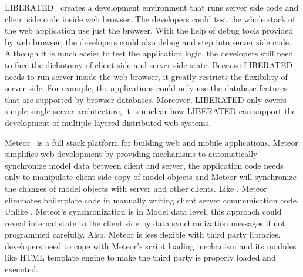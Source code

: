LIBERATED~\cite{lipman2011liberated} creates a development environment that runs server side code and 
client side code inside web browser.
The developers could test the whole stack of the web application use just the browser.
With the help of \js{} debug tools provided by web browser, the developers could also
debug and step into server side code.
Although it is much easier to test the application logic,
the developers still need to face the dichotomy of client side and server side state.
Because LIBERATED needs to run server inside the web browser,
it greatly restricts the flexibility of server side.
For example, the applications could only use the database features that are supported by
browser databases.
Moreover, LIBERATED only covers simple single-server architecture, 
it is unclear how LIBERATED can support the development of multiple layered distributed web systems.

Meteor~\cite{meteor} is a full stack platform for building web and mobile applications.
Meteor simplifies web development by providing mechanisms to automatically synchronize model data 
between client and server,
the application code needs only to manipulate client side copy of model objects and
Meteor will synchronize the changes of model objects with server and other clients.
Like \cb{}, Meteor eliminates boilerplate code in manually writing client server communication code.
Unlike \cb{}, Meteor's synchronization is in Model data level, this approach
could reveal internal state to the client side by data synchronization messages if not programmed carefully.
Also, Meteor is less flexible with third party \js{} libraries, 
developers need to cope with 
Meteor's script loading mechanism and its modules like HTML template engine
 to make the third party \js{} is properly loaded and executed.

